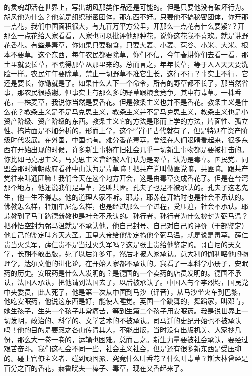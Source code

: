 \documentclass[cn,11pt,chinese]{elegantbook}
\begin{document}
的灵魂却活在世界上，写出胡风那类作品还是可能的。但是只要他没有破坏行为。胡风他为什么？他就是组织秘密团体，那东西不好。只要他不搞秘密团体，你开那一点花，我们中国面积很大，有九百万平方公里，开那么一点花有什么要紧?？开那么一点花给人家看看，人家也可以批评他那种花，说你这花我不喜欢。就是讲野花香花。有些是毒草，你如果只要粮食，只要大麦、小麦、苞谷、小米、大米、根本不要草。这个东西，每年农民都要除草，你们不信，今年春耕你们去看一看，那土里就要长草，不晓得那草从那里来的。总而言之，年年长草，等于人人天天要洗脸一样。农民年年要除草。禁止一切野草不准它生长，这行不行？事实上不行，它还是要长，你锄就是了。如果什么人下一个命令，所有的野草都不长了，那当然省事，那农民很感谢。但事实上有那么多的野草跟粮食竞争，其中有毒草。一株香花，一株麦草，我说你当然是要香花。但是教条主义也并不是香花。教条主义是什么花？教条主义是不是马克思主义，教条主义并不是马克思主义，教条主义也是小资产阶级、资产阶级的东西。教条主义它的方法是形而上学的方法，片面性、孤立性、搞片面是不加分析的，形而上学，这个“学问”古代就有了，但是特别在资产阶级时代发展。在外国，中国也有。难分香花毒草，曾经在人们眼睛看起来，很多东西在开始出现的时候，许多新生事物在旧社会几乎一切新生事物都是要被打击的。你比如马克思主义，马克思主义曾经被人们认为是野草，认为是毒草。国民党，同盟会那时清朝政府看孙中山认为是毒草嘛！把共产党叫做匪党嘛，共匪嘛。跟共产党往来叫通匪嘛！我们今天在这个地方开会，这是由毒草变成香花了。但是在台湾那个地方，他还说我们是毒草，还叫共匪。孔夫子也是不被承认的。孔夫子这老先生，他一生不得志。他的道理人家不听。耶苏，耶苏在开始时也是社会不承认的。佛教怎么样，释加牟尼怎么样，也是经过那么一个过程，受压迫，社会不承认。耶苏教到了马丁路德新教也是社会不承认的。孙行者，孙行者为什么被封为弼马温？把孙悟空封为弼马温就是不承认他，他自己封号、自己对自己的评价（干部鉴定）他自己的鉴定叫齐天大圣。玉皇大帝给他鉴定搞他个弼马温，就是说是毒草。薛仁贵当火头军，薛仁贵不是当过火头军吗？这是张士贵给他鉴定的。哥白尼的天文学，长期不敢出版，死了以后许多年，然后才被人家承认。意大利的伽利略他的物理学，达尔文他的进化论，在开始人家都不承认的。我看了一本科学小册子，安眠药的历史。安眠药是什么人发明的？是德国的一个卖药的店员发明的。德国不承认，法国人承认，把他请到法国去了，以后被承认了。中国人有个李烈均，国民党中央委员，此人死了，他是第一次从中国到马沙（译音），从马沙坐火车到巴黎，他吃安眠药，他说这东西是好，能使人睡觉。英国一个跳舞的，舞蹈家，叫邓肯，她生孩子，生头一个孩子非常痛苦，等到生第二个孩子用安眠药。我是说世界上一切发明，政治的、科学的、文学艺术的不被承认。司马迁的史纪开始也不被承认吗！他的目的是要藏之各山传请其人，不能出版，当时没有出版机关、大家抄几份，那么大一卷一卷的，运输也困难。总而言之。新生力量要被社会承认，要经过艰苦奋斗。我们这社会不同一些，社会主义社会，但是还有很多新东西是受压抑的。碰上官僚主义者、碰到顽固派、究竟什么叫香花？什么叫毒草？斯大林曾经是百分之百的香花，赫鲁晓夫一棒子、毒草，现在又香起来了。\\
\end{document}
